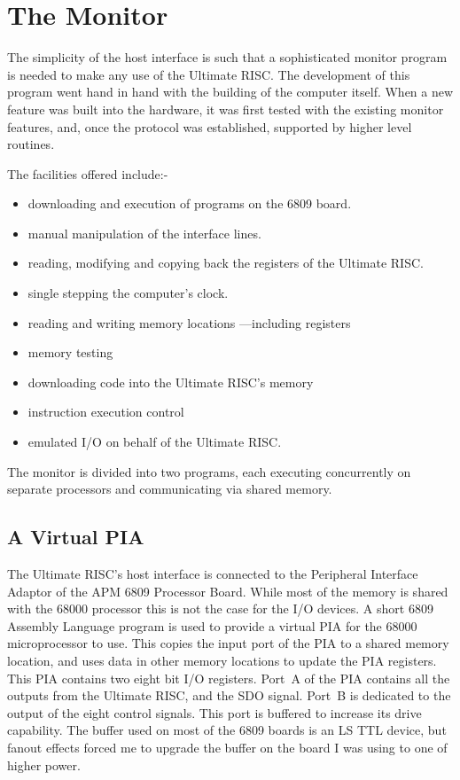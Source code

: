  

\section{The Monitor}

The simplicity of the host interface is such that a sophisticated monitor 
program is needed to make any use of the Ultimate RISC.
The development of this  program went hand in hand with the building 
of the computer itself.
When a new feature was built into the hardware, it was first tested with the
existing monitor features, and, once the protocol was established, supported
by higher level routines.

{\samepage
The facilities offered include:-
\begin{itemize}
\item downloading and execution of programs on the 6809 board.
\item manual manipulation of the  interface lines.
\item reading, modifying and copying back the registers of the Ultimate RISC.
\item single stepping the computer's clock.
\item reading and writing memory locations ---including registers
\item memory testing
\item downloading code into the Ultimate RISC's memory
\item instruction execution control
\item emulated I/O on behalf of the Ultimate RISC.
\end{itemize}
}

The monitor is divided into two programs, each executing 
concurrently on separate processors and communicating  via shared memory.

\subsection{A Virtual PIA}
The Ultimate RISC's host interface is  connected to the Peripheral Interface
Adaptor of the APM 6809 Processor Board. While most of the memory is shared 
with the 68000 processor this is not the case for the I/O devices.
A short 6809 Assembly Language program is used to provide a virtual PIA for 
the 68000 microprocessor to use. 
This copies the input port of 
the PIA to a shared memory location, and uses data in other
memory locations to update the PIA registers.
This PIA contains two  eight bit I/O registers.
Port~A of the PIA contains all the outputs from the Ultimate RISC, and the SDO signal. 
Port~B is dedicated to the output of the eight control signals. 
This port is buffered to increase its drive capability.
The buffer used on most of the 6809 boards is an LS TTL device, but fanout effects  forced  me to upgrade the buffer on the board I was using to one of higher power. 
 


